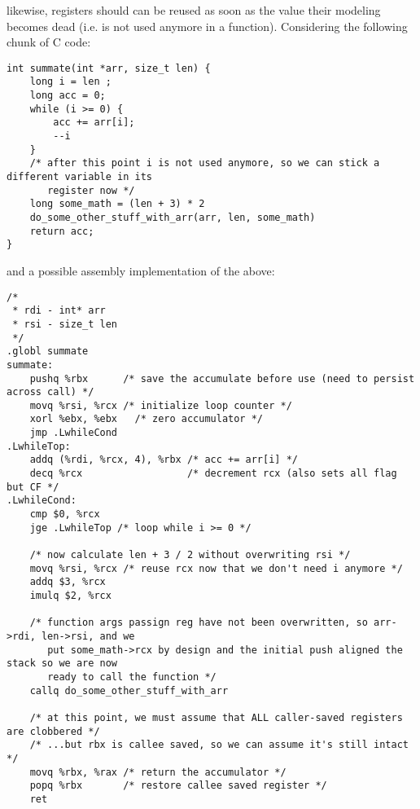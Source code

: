 \documentclass[11pt]{article}
\begin{document}
likewise, registers should can be reused as soon as the value their modeling becomes dead
(i.e. is not used anymore in a function). Considering the following chunk of C code:

\begin{lstlisting}
int summate(int *arr, size_t len) {
    long i = len ;
    long acc = 0;
    while (i >= 0) {
        acc += arr[i];
        --i
    }
    /* after this point i is not used anymore, so we can stick a different variable in its
       register now */
    long some_math = (len + 3) * 2
    do_some_other_stuff_with_arr(arr, len, some_math)
    return acc;
}
\end{lstlisting}

and a possible assembly implementation of the above:

\begin{lstlisting}
/*
 * rdi - int* arr
 * rsi - size_t len
 */
.globl summate
summate:
    pushq %rbx      /* save the accumulate before use (need to persist across call) */
    movq %rsi, %rcx /* initialize loop counter */
    xorl %ebx, %ebx   /* zero accumulator */
    jmp .LwhileCond
.LwhileTop:
    addq (%rdi, %rcx, 4), %rbx /* acc += arr[i] */
    decq %rcx                  /* decrement rcx (also sets all flag but CF */
.LwhileCond:
    cmp $0, %rcx
    jge .LwhileTop /* loop while i >= 0 */

    /* now calculate len + 3 / 2 without overwriting rsi */
    movq %rsi, %rcx /* reuse rcx now that we don't need i anymore */
    addq $3, %rcx
    imulq $2, %rcx

    /* function args passign reg have not been overwritten, so arr->rdi, len->rsi, and we
       put some_math->rcx by design and the initial push aligned the stack so we are now
       ready to call the function */
    callq do_some_other_stuff_with_arr

    /* at this point, we must assume that ALL caller-saved registers are clobbered */
    /* ...but rbx is callee saved, so we can assume it's still intact */
    movq %rbx, %rax /* return the accumulator */
    popq %rbx       /* restore callee saved register */
    ret
\end{lstlisting}
\end{document}
